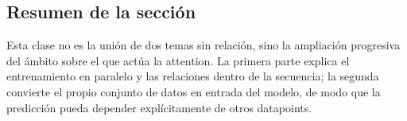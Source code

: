 \subsection{Resumen de la sección}

Esta clase no es la unión de dos temas sin relación, sino la ampliación progresiva del ámbito sobre el que actúa la attention. La primera parte explica el entrenamiento en paralelo y las relaciones dentro de la secuencia; la segunda convierte el propio conjunto de datos en entrada del modelo, de modo que la predicción pueda depender explícitamente de otros datapoints.
